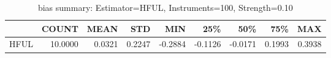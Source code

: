 \begin{table}[ht]
\centering
\caption{bias summary: Estimator=HFUL, Instruments=100, Strength=0.10}
\begin{tabular}{lrrrrrrrr}
\toprule
 & COUNT & MEAN & STD & MIN & 25\% & 50\% & 75\% & MAX \\
\midrule
HFUL & 10.0000 & 0.0321 & 0.2247 & -0.2884 & -0.1126 & -0.0171 & 0.1993 & 0.3938 \\
\bottomrule
\end{tabular}
\end{table}
